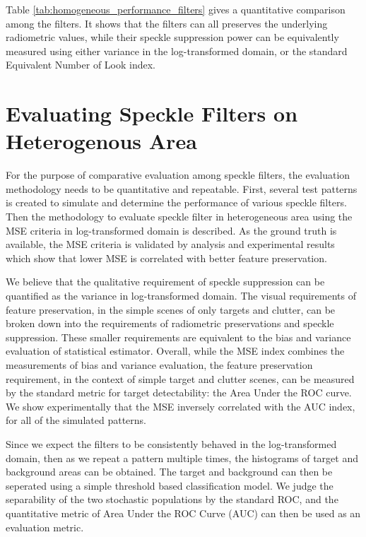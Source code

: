 \documentclass[journal]{IEEEtran}
\begin{document}
Table \ref{tab:homogeneous_performance_filters} gives a quantitative comparison among the filters.
It shows that the filters can all preserves the underlying radiometric values, while their speckle suppression power can be equivalently measured using either variance in the log-transformed domain, or the standard Equivalent Number of Look index.

\section{Evaluating Speckle Filters on Heterogenous Area}
\label{sec:eval_hetero}

For the purpose of comparative evaluation among speckle filters, the evaluation methodology needs to be quantitative and repeatable.
First, several test patterns is created to simulate and determine the performance of various speckle filters.
Then the methodology to evaluate speckle filter in heterogeneous area using the MSE criteria in log-transformed domain is described.
As the ground truth is available, the MSE criteria is validated by analysis and experimental results which show that lower MSE is correlated with better feature preservation.

We believe that the qualitative requirement of speckle suppression can be quantified as the variance in log-transformed domain. 
The visual requirements of feature preservation, in the simple scenes of only targets and clutter, can be broken down into the requirements of radiometric preservations and speckle suppression.
These smaller requirements are equivalent to the bias and variance evaluation of statistical estimator.
Overall, while the MSE index combines the measurements of bias and variance evaluation, 
	the feature preservation requirement, in the context of simple target and clutter scenes, can be measured by the standard metric for target detectability: the Area Under the ROC curve.
We show experimentally that the MSE inversely correlated with the AUC index, for all of the simulated patterns.

Since we expect the filters to be consistently behaved in the log-transformed domain, then as we repeat a pattern multiple times, the histograms of target and background areas can be obtained.
The target and background can then be seperated using a simple threshold based classification model.
We judge the separability of the two stochastic populations by the standard ROC, and the quantitative metric of Area Under the ROC Curve (AUC) can then be used as an evaluation metric.
\end{document}
